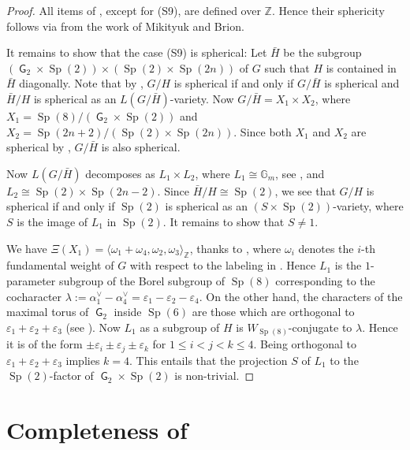 \documentclass[12pt]{amsart}
\renewcommand{\epsilon}{\varepsilon}
\newcommand\BBZ{{\mathbb Z}}
\newcommand\G{{\operatorname{\mathsf G}}}
\newcommand\Sp{\operatorname{Sp}}
\numberwithin{equation}{section}
\theoremstyle{definition}
\begin{document}
\begin{proof}
  All items of , except for (S9), are defined over
  $\BBZ$. Hence their sphericity follows via  from
  the work of Mikityuk and Brion.
	
  It remains to show that the case (S9) is spherical: Let $\bar H$ be the
  subgroup $(\G_2 \times \Sp(2)) \times (\Sp(2) \times \Sp(2n))$ of
  $G$ such that $H$ is contained in $\bar H$ diagonally.  Note that by
  , $G/H$ is spherical if and only if $G/ \bar H$ is
  spherical and $\bar H/H$ is spherical as an $L(G/\bar H)$-variety.  Now
  $G/\bar H = X_1 \times X_2$, where
  $X_1 = \Sp(8)/(\G_2 \times \Sp(2))$ and
  $X_2 = \Sp(2n +2 )/(\Sp(2) \times \Sp(2n))$.  Since both $X_1$ and
  $X_2$ are spherical by \cite{KR}, $G/\bar H$ is also spherical.
	
  Now $L(G/\bar H)$ decomposes as $L_1 \times L_2$, where
  $L_1 \cong \mathbb{G}_m$, see \cite[Prop.\ 4.5]{KR}, and
  $L_2 \cong \Sp(2) \times \Sp(2n-2)$. Since $\bar H/H \cong \Sp(2)$,
  we see that $G/H$ is spherical if and only if $\Sp(2)$ is spherical
  as an $(S \times \Sp(2))$-variety, where $S$ is the image of $L_1$
  in $\Sp(2)$. It remains to show that $S \ne 1$.
	
  We have
  $\Xi(X_1)=\langle \omega_1+\omega_4,\omega_2,\omega_3\rangle_\BBZ$,
  thanks to \cite[Prop.\ 4.5]{KR}, where $\omega_i$ denotes the $i$-th
  fundamental weight of $G$ with respect to the labeling in
  \cite[Planche III]{bourbaki:groupes}.  Hence $L_1$ is the
  $1$-parameter subgroup of the Borel subgroup of $\Sp(8)$
  corresponding to the cocharacter
  $\lambda:=\alpha_1^\vee - \alpha_4^\vee = \epsilon_1 - \epsilon_2 -
  \epsilon_4$. On the other hand, the characters of the maximal torus
  of $\G_2$ inside $\Sp(6)$ are those which are
  orthogonal to $\epsilon_1 + \epsilon_2 + \epsilon_3$ (see
  \cite[Planche IX]{bourbaki:groupes}). Now $L_1$ as a subgroup of $H$ is
  $W_{\Sp(8)}$-conjugate to $\lambda$. Hence it is of the form
  $\pm \epsilon_i \pm \epsilon_j \pm \epsilon_k$ for
  $1 \leqslant i < j < k \leqslant 4$. Being orthogonal to
  $\epsilon_1 + \epsilon_2 + \epsilon_3$ implies $k = 4$.  This
  entails that the projection $S$ of $L_1$ to the $\Sp(2)$-factor of
  $\G_2 \times \Sp(2)$ is non-trivial.
\end{proof}


\section{Completeness of }
\end{document}
